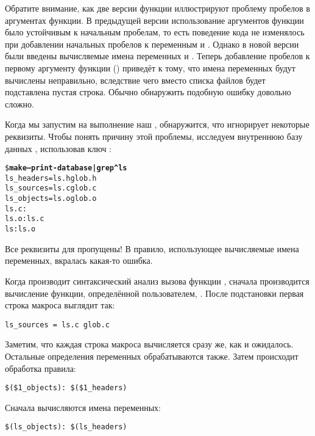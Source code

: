 Обратите внимание, как две версии функции 
иллюстрируют проблему пробелов в аргументах функции. В предыдущей
версии использование аргументов функции было устойчивым к начальным
пробелам, то есть поведение кода не изменялось при добавлении
начальных пробелов к переменным  и .
Однако в новой версии были введены вычисляемые имена переменных
 и .
Теперь добавление пробелов к первому аргументу функции ()
приведёт к тому, что имена переменных будут вычислены неправильно,
вследствие чего вместо списка файлов будет подставлена пустая строка.
Обычно обнаружить подобную ошибку довольно сложно.

Когда мы запустим на выполнение наш \Makefile{}, обнаружится, что
\GNUmake{} игнорирует некоторые  реквизиты.  Чтобы понять
причину этой проблемы, исследуем внутреннюю базу данных \GNUmake{},
использовав ключ :

{\footnotesize
\begin{alltt}
\${} \textbf{make --print-database | grep \^{}ls}
ls\_headers = ls.h glob.h
ls\_sources = ls.c glob.c
ls\_objects = ls.o glob.o
ls.c:
ls.o: ls.c
ls: ls.o
\end{alltt}
}

Все  реквизиты для  пропущены! В правило,
использующее вычисляемые имена переменных, вкралась какая-то ошибка.

Когда \GNUmake{} производит синтаксический анализ вызова функции
, сначала производится вычисление функции, определённой
пользователем, . После подстановки первая
строка макроса выглядит так:

{\footnotesize
\begin{verbatim}
ls_sources = ls.c glob.c
\end{verbatim}
}

Заметим, что каждая строка макроса вычисляется сразу же, как и
ожидалось.  Остальные определения переменных обрабатываются также.
Затем происходит обработка правила:

{\footnotesize
\begin{verbatim}
$($1_objects): $($1_headers)
\end{verbatim}
}

Сначала вычисляются имена переменных:

{\footnotesize
\begin{verbatim}
$(ls_objects): $(ls_headers)
\end{verbatim}
}


